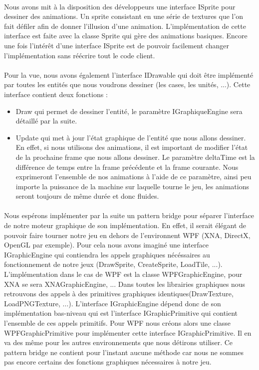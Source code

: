 		\paragraph{}
		Nous avons mit à la disposition des développeurs une interface ISprite pour dessiner des animations. Un sprite consistant en une série de textures que l'on fait défiler afin de donner l'illusion 
		d'une animation. L'implémentation de cette interface est faite avec la classe Sprite qui gère des animations basiques. Encore une fois l'intérêt d'une interface ISprite est de pouvoir facilement changer l'implémentation
		sans réécrire tout le code client.
		\paragraph{}
		Pour la vue, nous avons également l'interface IDrawable qui doit être implémenté par toutes les entités que nous voudrons dessiner (les cases, les unités, ...). 
		Cette interface contient deux fonctions :
		\begin{itemize}		
		\item Draw qui permet de dessiner l'entité, le paramètre IGraphiqueEngine sera détaillé par la suite.
		\item Update qui met à jour l'état graphique de l'entité que nous allons dessiner. En effet, si nous utilisons des animations, il est important de modifier l'état de la prochaine frame que nous allons dessiner.
		Le paramètre deltaTime est la différence de temps entre la frame précédente et la frame courante. Nous exprimeront l'ensemble de nos animations à l'aide de ce paramètre, ainsi peu importe la puissance de la machine
		sur laquelle tourne le jeu, les animations seront toujours de même durée et donc fluides.
		\end{itemize}
		\paragraph{}
			Nous espérons implémenter par la suite un pattern bridge pour séparer l'interface de notre moteur graphique de son implémentation. 
		En effet, il serait élégant de pouvoir faire tourner notre jeu en dehors de l'environnent WPF (XNA, DirectX, OpenGL par exemple).
		Pour cela nous avons imaginé une interface IGraphicEngine qui contiendra les appels graphiques nécéssaires au fonctionnement de notre jeux (DrawSprite, CreateSprite, LoadTile, ...).
		L'implémentation dans le cas de WPF est la classe WPFGraphicEngine, pour XNA se sera XNAGraphicEngine, ...
		Dans toutes les librairies graphiques nous retrouvons des appels à des primitives graphiques identiques(DrawTexture, LoadPNGTexture, ...). 
			L'interface IGraphicEngine dépend donc de son implémentation bas-niveau qui est l'interface IGraphicPrimitive qui contient l'ensemble de ces appels primitifs.
		Pour WPF nous créons alors une classe WPFGraphicPrimitive pour implémenter cette interface IGraphicPrimitive. Il en va des même pour les autres environnements que nous détirons utiliser.
		Ce pattern bridge ne contient pour l'instant aucune méthode car nous ne sommes pas encore certains des fonctions graphiques nécessaires à notre jeu.

